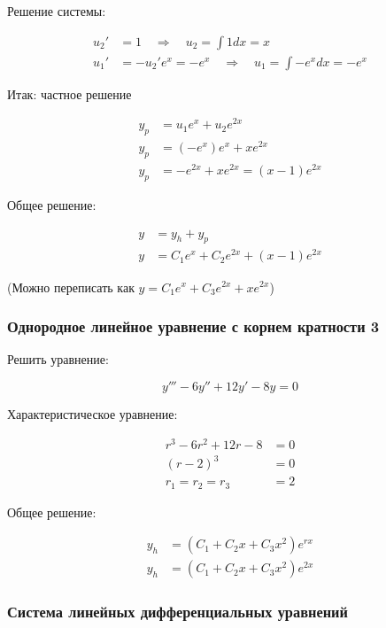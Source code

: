 Решение системы:

\begin{align*}
    u_2' &= 1 \quad \Rightarrow \quad u_2 = \int 1 dx = x \\
    u_1' &= - u_2' e^x = - e^x \quad \Rightarrow \quad u_1 = \int - e^x dx = - e^x
\end{align*}

Итак: частное решение

\begin{align*}
    y_p &= u_1 e^x + u_2 e^{2x} \\
    y_p &= (- e^x) e^x + x e^{2x} \\
    y_p &= - e^{2x} + x e^{2x} = (x-1) e^{2x}
\end{align*}

Общее решение:

\begin{align*}
    y &= y_h + y_p \\
    y &= C_1 e^x + C_2 e^{2x} + (x-1) e^{2x}
\end{align*}

(Можно переписать как $y = C_1 e^x + C_3 e^{2x} + xe^{2x}$)

\subsubsection{Однородное линейное уравнение с корнем кратности 3}

Решить уравнение:

\begin{equation*}
    y''' - 6y'' + 12y' - 8y = 0
\end{equation*}

Характеристическое уравнение:

\begin{align*}
    r^3 - 6r^2 + 12r - 8 &= 0 \\
    (r - 2)^3 &= 0 \\
    r_1 = r_2 = r_3 &= 2
\end{align*}

Общее решение:

\begin{align*}
    y_h &= (C_1 + C_2 x + C_3 x^2) e^{r x} \\
    y_h &= (C_1 + C_2 x + C_3 x^2) e^{2x}
\end{align*}

\subsubsection{Система линейных дифференциальных уравнений}

